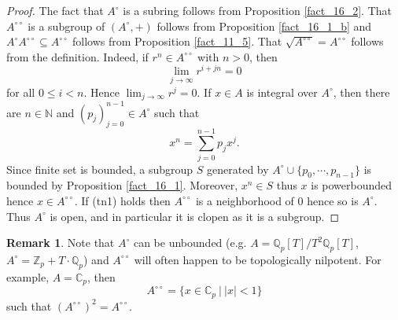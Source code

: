 \documentclass[10pt]{article}
\numberwithin{equation}{section}
\theoremstyle{definition}
\newtheorem{remark}{Remark}[subsection]
\newcommand{\N}[0]{\mathbb{N}}
\newcommand{\Z}[0]{\mathbb{Z}}
\newcommand{\C}[0]{\mathbb{C}}
\newcommand{\Q}[0]{\mathbb{Q}}
\newcommand{\sep}[0]{\:|\:}
\newcommand{\dcirc}[0]{{\circ\circ}}
\begin{document}
\begin{proof}
    The fact that $A^\circ$ is a subring follows from Proposition \ref{fact_16_2}. That $A^\dcirc$ is a subgroup of $(A^\circ,+)$ follows from Proposition \ref{fact_16_1_b} and $A^\circ A^\dcirc\subseteq A^\dcirc$ follows from Proposition \ref{fact_11_5}. That $\sqrt{A^\dcirc}=A^\dcirc$ follows from the definition. Indeed, if $r^n\in A^\dcirc$ with $n>0$, then
    \begin{equation*}
        \lim_{j\to\infty}r^{i+jn}=0
    \end{equation*}
    for all $0\leq i <n$. Hence $\lim_{j\to\infty}r^j=0$. If $x\in A$ is integral over $A^\circ$, then there are $n\in\N$ and $(p_j)_{j=0}^{n-1}\in A^\circ$ such that
    \begin{equation*}
        x^n = \sum_{j=0}^{n-1}p_jx^j.
    \end{equation*}
    Since finite set is bounded, a subgroup $S$ generated by $A^\circ\cup\{p_0,\cdots,p_{n-1}\}$ is bounded by Proposition \ref{fact_16_1}. Moreover, $x^n\in S$ thus $x$ is powerbounded hence $x\in A^\dcirc$. If (tn1) holds then $A^\dcirc$ is a neighborhood of $0$ hence so is $A^\circ$. Thus $A^\circ$ is open, and in particular it is clopen as it is a subgroup.
\end{proof}

\begin{remark}
    \label{remark_16_2}
    Note that $A^\circ$ can be unbounded (e.g. $A=\Q_p[T]/T^2\Q_p[T]$, $A^\circ = \Z_p+T\cdot\Q_p$) and $A^\dcirc$ will often happen to be topologically nilpotent. For example, $A=\C_p$, then
    \begin{equation*}
        A^\dcirc = \{x\in\C_p\sep \vert x\vert<1\}
    \end{equation*}
    such that $(A^\dcirc)^2 = A^\dcirc$.
\end{remark}
\end{document}
